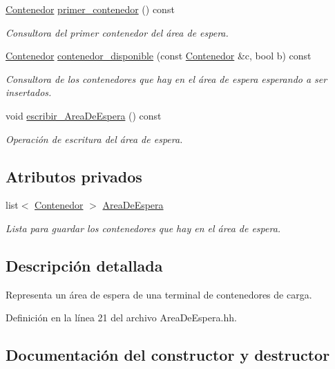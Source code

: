 \begin{DoxyCompactItemize}
\hyperlink{class_contenedor}{Contenedor} \hyperlink{class_espera_acf8ff210426ca3e799cf667d887e9daa}{primer\+\_\+contenedor} () const
\begin{DoxyCompactList}\small\item\em Consultora del primer contenedor del área de espera. \end{DoxyCompactList}\item 
\hyperlink{class_contenedor}{Contenedor} \hyperlink{class_espera_ab4205de26cc518d8130d6506796697ea}{contenedor\+\_\+disponible} (const \hyperlink{class_contenedor}{Contenedor} \&c, bool b) const
\begin{DoxyCompactList}\small\item\em Consultora de los contenedores que hay en el área de espera esperando a ser insertados. \end{DoxyCompactList}\item 
void \hyperlink{class_espera_aacb008e5be8ecd85fbba9cdef8b8be33}{escribir\+\_\+\+Area\+De\+Espera} () const
\begin{DoxyCompactList}\small\item\em Operación de escritura del área de espera. \end{DoxyCompactList}\end{DoxyCompactItemize}
\subsection*{Atributos privados}
\begin{DoxyCompactItemize}
\item 
list$<$ \hyperlink{class_contenedor}{Contenedor} $>$ \hyperlink{class_espera_adafca5e22c5bc21e517b363144fc6b18}{Area\+De\+Espera}
\begin{DoxyCompactList}\small\item\em Lista para guardar los contenedores que hay en el área de espera. \end{DoxyCompactList}\end{DoxyCompactItemize}


\subsection{Descripción detallada}
Representa un área de espera de una terminal de contenedores de carga. 

Definición en la línea 21 del archivo Area\+De\+Espera.\+hh.



\subsection{Documentación del constructor y destructor}
\mbox{\label{class_espera_aeabb86dcbffd8c2b686fe330581ac82b}} 
